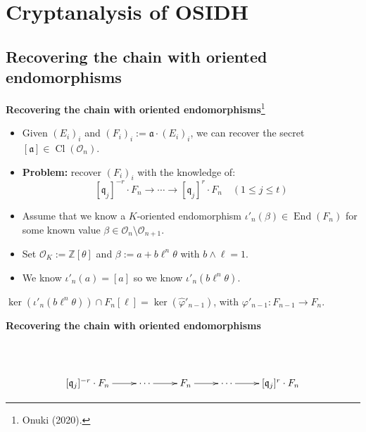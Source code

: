 \documentclass[10pt]{beamer}
\theoremstyle{plain}
\theoremstyle{definition}
\newcommand{\Z}{\mathbb{Z}}
\newcommand{\mO}{\mathcal{O}}
\renewcommand{\(}{\left(}
\renewcommand{\)}{\right)}
\newcommand{\mf}[1]{\mathfrak{#1}}
\newcommand{\mfq}{\mathfrak{q}}
\DeclareMathOperator{\End}{End}
\DeclareMathOperator{\Cl}{Cl}
\begin{document}
\section{Cryptanalysis of OSIDH}

\subsection{Recovering the chain with oriented endomorphisms}

\begin{frame}
\textbf{Recovering the chain with oriented endomorphisms}\footnote[frame]{Onuki (2020).}

\vspace{0.5cm}

\begin{itemize}
\item Given $(E_i)_{i}$ and $(F_i)_{i}:=\mf{a}\cdot(E_i)_{i}$, we can recover the secret $[\mf{a}]\in\Cl(\mO_n)$.

\pause

\item \textbf{Problem:} recover $(F_i)_{i}$ with the knowledge of:
\[[\mfq_j]^{-r}\cdot F_{n}\longrightarrow \cdots\longrightarrow [\mfq_j]^{r}\cdot F_{n} \quad (1\leq j\leq t)\]

\pause

\item Assume that we know a $K$-oriented endomorphism $\iota'_n(\beta)\in\End(F_n)$ for some known value $\beta\in\mO_n\setminus\mO_{n+1}$.

\pause

\item Set $\mO_K:=\Z[\theta]$ and $\beta:=a+b\ell^n\theta$ with $b\wedge\ell=1$.

\item We know $\iota'_n(a)=[a]$ so we know $\iota'_n(b\ell^n\theta)$.
\end{itemize}

\pause

\begin{lemma}
$\ker(\iota'_n(b\ell^n\theta))\cap F_n[\ell]=\ker(\widehat{\varphi}'_{n-1})$, with $\varphi'_{n-1}:F_{n-1}\longrightarrow F_n$.
\end{lemma}

\end{frame}

\begin{frame}
\textbf{Recovering the chain with oriented endomorphisms}

\vspace{0.5cm}

\[\xymatrix{
 										      &                     &  & &\\
[\mf{q}_j]^{-r}\cdot F_n \ar[r] & \cdots \ar[r]& F_n \ar[r] & \cdots \ar[r]& [\mf{q}_j]^r\cdot F_n\\
}\]
\end{frame}
\end{document}
